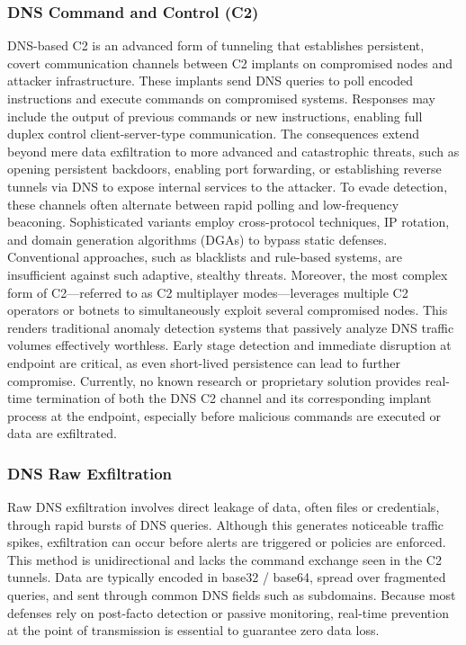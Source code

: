 \documentclass [11pt, proquest] {uwthesis}[2020/02/24]
\begin{document}
\subsubsection{DNS Command and Control (C2)}
DNS-based C2 is an advanced form of tunneling that establishes persistent, covert communication channels between C2 implants on compromised nodes and attacker infrastructure. These implants send DNS queries to poll encoded instructions and execute commands on compromised systems. Responses may include the output of previous commands or new instructions, enabling full duplex control client-server-type communication. The consequences extend beyond mere data exfiltration to more advanced and catastrophic threats, such as opening persistent backdoors, enabling port forwarding, or establishing reverse tunnels via DNS to expose internal services to the attacker. To evade detection, these channels often alternate between rapid polling and low-frequency beaconing. Sophisticated variants employ cross-protocol techniques, IP rotation, and domain generation algorithms (DGAs) to bypass static defenses. Conventional approaches, such as blacklists and rule-based systems, are insufficient against such adaptive, stealthy threats. Moreover, the most complex form of C2—referred to as C2 multiplayer modes—leverages multiple C2 operators or botnets to simultaneously exploit several compromised nodes. This renders traditional anomaly detection systems that passively analyze DNS traffic volumes effectively worthless. Early stage detection and immediate disruption at endpoint are critical, as even short-lived persistence can lead to further compromise. Currently, no known research or proprietary solution provides real-time termination of both the DNS C2 channel and its corresponding implant process at the endpoint, especially before malicious commands are executed or data are exfiltrated.


\subsubsection{DNS Raw Exfiltration}
Raw DNS exfiltration involves direct leakage of data, often files or credentials, through rapid bursts of DNS queries. Although this generates noticeable traffic spikes, exfiltration can occur before alerts are triggered or policies are enforced.
This method is unidirectional and lacks the command exchange seen in the C2 tunnels. Data are typically encoded in base32 / base64, spread over fragmented queries, and sent through common DNS fields such as subdomains. Because most defenses rely on post-facto detection or passive monitoring, real-time prevention at the point of transmission is essential to guarantee zero data loss.
\end{document}
